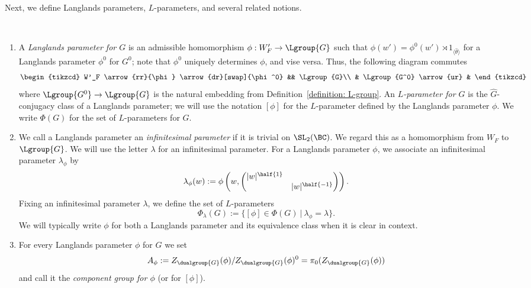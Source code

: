 \documentclass[11pt,letterpaper]{amsart}
\numberwithin{equation}{section}
\begin{document}
Next, we define Langlands parameters, $L$-parameters, and several related notions.

\begin{definition}\label{definition: parameters}\ 
\begin{enumerate}
    \item  A {\it Langlands parameter for $G$} is an admissible homomorphism $\phi: W_F' \to \Lgroup{G}$ such that $\phi(w') = \phi^0(w')\rtimes 1_{\langle{\hat\theta}\rangle}$ for a Langlands parameter $\phi^0$ for $G^0$; note that $\phi^0$ uniquely determines $\phi$, and vise versa. 
  Thus, the following diagram commutes
\[
\begin{tikzcd}
W'_F \arrow{rr}{\phi} \arrow{dr}[swap]{\phi^0} && \Lgroup{G}\\
& \Lgroup{G^0} \arrow{ur} &
\end{tikzcd}
\]
where $\Lgroup{G^0} \to \Lgroup{G}$ is the natural embedding from Definition~\ref{definition: L-group}.
An {\it $L$-parameter for $G$}\IN{$[\phi]$, $L$-parameter for $G$} is the $\widehat{G}$-conjugacy class of a Langlands parameter; we will use the notation $[\phi]$ for the $L$-parameter defined by the Langlands parameter $\phi$.
We write $\Phi(G)$ for the set of $L$-parameters for $G$.



\item
We call a Langlands parameter an {\it infinitesimal parameter} if it is trivial on $\SL_2(\BC)$. We regard this as a homomorphism from $W_F$ to $\Lgroup{G}$. We will use the letter $\lambda$ for an infinitesimal parameter. For a Langlands parameter $\phi$, we associate an infinitesimal parameter $\lambda_{\phi}$ by 
\[ \lambda_{\phi}(w):= \phi\left(w, \begin{pmatrix}
    |w|^{\half{1}} & \\ &|w|^{\half{-1}}
\end{pmatrix}\right).\]
Fixing an infinitesimal parameter $\lambda$, we define the set of $L$-parameters  
\[\Phi_{\lambda}(G):= \{[\phi] \in \Phi(G)\ | \ \lambda_{\phi}=\lambda\}. \] 
We will typically write $\phi$ for both a Langlands parameter and its equivalence class when it is clear in context.
\item For every Langlands parameter $\phi$ for $G$ we set
\begin{equation}\label{eq: disconnected component group langlands parameter}
A_\phi := Z_{\dualgroup{G}}(\phi)/Z_{\dualgroup{G}}(\phi)^0 = \pi_0(Z_{\dualgroup{G}}(\phi))
\end{equation}
 and call it the {\it component group for $\phi$} (or for $[\phi]$). 


\end{enumerate}
\end{definition}
\end{document}
